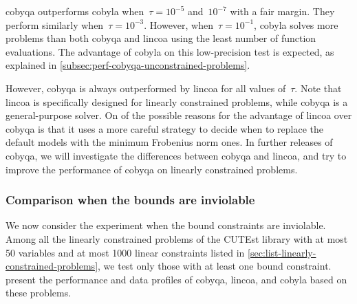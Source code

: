 \gls{cobyqa} outperforms \gls{cobyla} when~$\tau = 10^{-5}$ and~$10^{-7}$ with a fair margin.
They perform similarly when~$\tau = 10^{-3}$.
However, when~$\tau = 10^{-1}$, \gls{cobyla} solves more problems than both \gls{cobyqa} and \gls{lincoa} using the least number of function evaluations.
The advantage of \gls{cobyla} on this low-precision test is expected, as explained in \cref{subsec:perf-cobyqa-unconstrained-problems}.

However, \gls{cobyqa} is always outperformed by \gls{lincoa} for all values of~$\tau$.
Note that \gls{lincoa} is specifically designed for linearly constrained problems, while \gls{cobyqa} is a general-purpose solver.
On of the possible reasons for the advantage of \gls{lincoa} over \gls{cobyqa} is that it uses a more careful strategy to decide when to replace the default models with the minimum Frobenius norm ones.
In further releases of \gls{cobyqa}, we will investigate the differences between \gls{cobyqa} and \gls{lincoa}, and try to improve the performance of \gls{cobyqa} on linearly constrained problems.

\subsubsection{Comparison when the bounds are inviolable}

We now consider the experiment when the bound constraints are inviolable.
Among all the linearly constrained problems of the CUTEst library with at most \num{50} variables and at most \num[group-minimum-digits=4]{1000} linear constraints listed in \cref{sec:list-linearly-constrained-problems}, we test only those with at least one bound constraint.
 present the performance and data profiles of \gls{cobyqa}, \gls{lincoa}, and \gls{cobyla} based on these problems.

